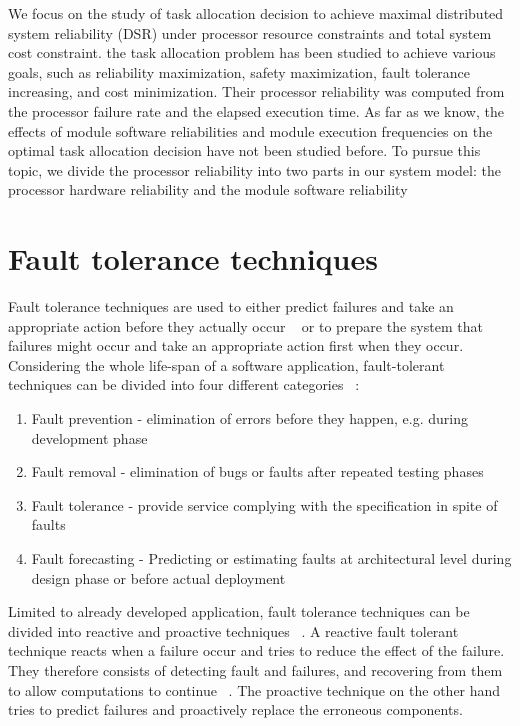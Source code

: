 \documentclass{cslthse-msc}
\begin{document}
We focus on the study of task allocation decision to achieve maximal distributed system reliability (DSR) under processor resource constraints and total system cost constraint. the task allocation problem has been studied to achieve various goals, such as reliability maximization, safety maximization, fault tolerance increasing, and cost minimization. Their processor reliability was computed from the processor failure rate and the elapsed execution time. As far as we know, the effects of module software reliabilities and module execution frequencies on the optimal task allocation decision have not been studied before. To pursue this topic, we divide the processor reliability into two parts in our system model: the processor hardware reliability and the module software reliability \cite{decisionModelTaskAllocation}
\fi

\section{Fault tolerance techniques} \label{sec:background_fault_tol_tech}
Fault tolerance techniques are used to either predict failures and take an appropriate action before they actually occur
~\cite{faultToleranceChallenges} or to prepare the system that failures might occur and take an appropriate action first when they occur. Considering the whole life-span of a software application, fault-tolerant techniques can be divided into four different categories ~\cite{surveyReliabilityDistr}:

\begin{enumerate}
\item Fault prevention - elimination of errors before they happen, e.g. during development phase
\item Fault removal - elimination of bugs or faults after repeated testing phases
\item Fault tolerance - provide service complying with the specification in spite of faults
\item Fault forecasting - Predicting or estimating faults at architectural level during design phase or before actual deployment
\end{enumerate}

Limited to already developed application, fault tolerance techniques can be divided into reactive and proactive techniques ~\cite{faultToleranceChallenges}. A reactive fault tolerant technique reacts when a failure occur and tries to reduce the effect of the failure. They therefore consists of detecting fault and failures, and recovering from them to allow computations to continue ~\cite{relGridSystems}. The proactive technique on the other hand tries to predict failures and proactively replace the erroneous components.
\end{document}
